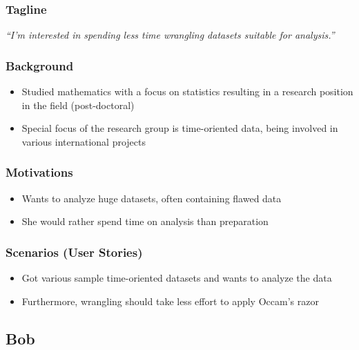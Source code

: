 \subsubsection{Tagline}

\textit{``I'm interested in spending less time wrangling datasets suitable for analysis.''}

\subsubsection{Background}

\begin{itemize}
    \item Studied mathematics with a focus on statistics resulting in a research position in the field (post-doctoral)
    \item Special focus of the research group is time-oriented data, being involved in various international projects
\end{itemize}

\subsubsection{Motivations}

\begin{itemize}
    \item Wants to analyze huge datasets, often containing flawed data
    \item She would rather spend time on analysis than preparation
\end{itemize}

\subsubsection{Scenarios (User Stories)}

\begin{itemize}
    \item Got various sample time-oriented datasets and wants to analyze the data
    \item Furthermore, wrangling should take less effort to apply Occam's razor
\end{itemize}


\subsection{Bob}

